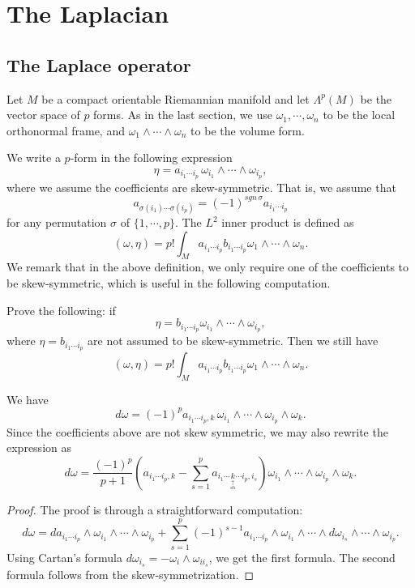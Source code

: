 
\chapter{The Laplacian}\label{Laplacian}
 
\section{The Laplace operator}\label{Laplace_operator}
Let $M$ be a compact orientable Riemannian manifold and let $\Lambda^p(M)$ be the vector space of $p$ forms. As in the last section, we use $\omega_1,\cdots,\omega_n$ to be the local orthonormal frame, and $\omega_1\wedge\cdots\wedge\omega_n$ to be  the volume form.

We write a $p$-form in the following 
expression
\[
\eta=a_{i_1\cdots i_p}\,\omega_{i_1}\wedge\cdots\wedge\omega_{i_p},
\]
where we assume the coefficients are skew-symmetric. That is, we assume that
\[
a_{\sigma(i_1)\cdots\sigma(i_p)}=(-1)^{sgn\,\sigma}a_{i_1\cdots i_p}
\]
for any permutation $\sigma$ of $\{1,\cdots,p\}$.
The $L^2$ inner product is defined as
\begin{equation}\label{p-3}
(\omega,\eta)=p!\int_M a_{i_1\cdots i_p}b_{i_1\cdots i_p}\omega_1\wedge\cdots\wedge\omega_n.
\end{equation}
We remark that in the above definition, we only require one of the coefficients to be skew-symmetric, which is useful in the following computation.


\begin{ex} Prove the following: if 
\[
\eta=b_{i_1\cdots i_p}\omega_{i_1}\wedge\cdots\wedge\omega_{i_p},
\]
where $\eta=b_{i_1\cdots i_p}$ are not assumed to be skew-symmetric. Then we still have
\[
(\omega,\eta)=p!\int_M a_{i_1\cdots i_p}b_{i_1\cdots i_p}\omega_1\wedge\cdots\wedge\omega_n.
\]
\end{ex}

\begin{lemma} We have
\[
d\omega=(-1)^pa_{i_1\cdots i_p,k}\,\omega_{i_1}\wedge\cdots\wedge\omega_{i_p}\wedge\omega_k.
\]
Since the coefficients above are not skew symmetric, we may also rewrite the expression as
\[
d\omega=\frac{(-1)^p}{p+1}\left(
a_{i_1\cdots i_p,k}-\sum_{s=1}^p a_{i_1\cdots \underset{\underset{sth}{\uparrow}}k\cdots i_p, i_s}\right)
\omega_{i_1}\wedge\cdots\wedge\omega_{i_p}\wedge\omega_k.
\]
\end{lemma}

\begin{proof}
 The proof is through a straightforward computation:
\[
d\omega=da_{i_1\cdots i_p}\wedge\omega_{i_1}\wedge\cdots\wedge\omega_{i_p}+\sum_{s=1}^p(-1)^{s-1}
a_{i_1\cdots i_p}\wedge\omega_{i_1}\wedge\cdots\wedge d\omega_{i_s}\wedge\cdots\wedge\omega_{i_p}.
\]
Using Cartan's formula $d\omega_{i_s}=-\omega_i\wedge\omega_{ii_s}$, we get the first formula. The second formula follows from the  skew-symmetrization.

\end{proof}




